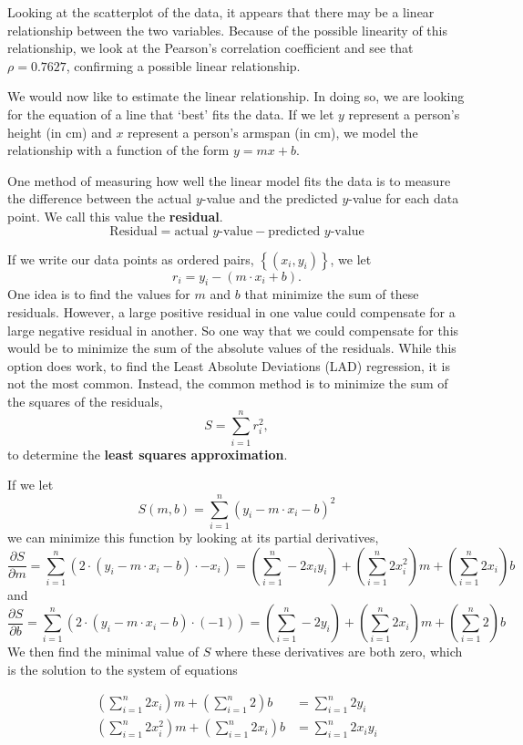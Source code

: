\documentclass[
]{book}
\theoremstyle{definition}
\theoremstyle{definition}
\theoremstyle{definition}
\theoremstyle{definition}
\theoremstyle{remark}
\begin{document}
Looking at the scatterplot of the data, it appears that there may be a linear relationship between the two variables. Because of the possible linearity of this relationship, we look at the Pearson's correlation coefficient and see that \(\rho = 0.7627\), confirming a possible linear relationship.

We would now like to estimate the linear relationship. In doing so, we are looking for the equation of a line that `best' fits the data. If we let \(y\) represent a person's height (in cm) and \(x\) represent a person's armspan (in cm), we model the relationship with a function of the form \(y=mx+b\).

One method of measuring how well the linear model fits the data is to measure the difference between the actual \(y\)-value and the predicted \(y\)-value for each data point. We call this value the \textbf{residual}.
\[\mbox{Residual} = \mbox{actual }y\mbox{-value} - \mbox{predicted }y\mbox{-value}\]

If we write our data points as ordered pairs, \(\left\{ (x_i,y_i)\right\}\), we let
\[r_i = y_i - \left( m\cdot x_i + b\right).\]
One idea is to find the values for \(m\) and \(b\) that minimize the sum of these residuals. However, a large positive residual in one value could compensate for a large negative residual in another. So one way that we could compensate for this would be to minimize the sum of the absolute values of the residuals. While this option does work, to find the Least Absolute Deviations (LAD) regression, it is not the most common. Instead, the common method is to minimize the sum of the squares of the residuals,
\[S = \sum_{i=1}^n r_i^2,\] to determine the \textbf{least squares approximation}.

If we let
\[S(m,b) = \sum_{i=1}^n (y_i - m\cdot x_i -b)^2\] we can minimize this function by looking at its partial derivatives,
\[\frac{\partial S}{\partial m} = \sum_{i=1}^n \left( 2 \cdot (y_i - m \cdot x_i - b ) \cdot -x_i \right) = \left( \sum_{i=1}^n -2 x_i y_i \right) + \left(\sum_{i=1}^n 2x_i^2 \right) m + \left(\sum_{i=1}^n 2 x_i \right) b\] and \[\frac{\partial S}{\partial b} = \sum_{i=1}^n \left( 2 \cdot (y_i-m\cdot x_i - b) \cdot (-1) \right)  = \left(\sum_{i=1}^n -2y_i \right) +  \left( \sum_{i=1}^n 2 x_i \right) m + \left( \sum_{i=1}^n 2 \right) b\]
We then find the minimal value of \(S\) where these derivatives are both zero, which is the solution to the system of equations

\begin{align}
  \left( \sum_{i=1}^n 2 x_i \right) m + \left( \sum_{i=1}^n 2 \right) b    & = \sum_{i=1}^n 2y_i   \\
  \left(\sum_{i=1}^n 2x_i^2 \right) m + \left(\sum_{i=1}^n 2 x_i \right) b   & =  \sum_{i=1}^n 2 x_i y_i 
\end{align}
\end{document}
